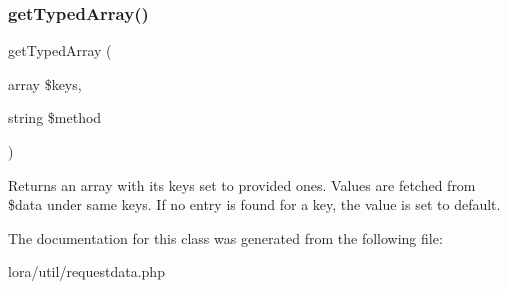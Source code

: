 \subsubsection{\texorpdfstring{get\+Typed\+Array()}{getTypedArray()}}
{\footnotesize\ttfamily get\+Typed\+Array (\begin{DoxyParamCaption}\item[{array}]{\$keys,  }\item[{string}]{\$method }\end{DoxyParamCaption})\hspace{0.3cm}{\ttfamily [private]}}

Returns an array with its keys set to provided ones. Values are fetched from \$data under same keys. If no entry is found for a key, the value is set to default. 


The documentation for this class was generated from the following file\+:\begin{DoxyCompactItemize}
\item 
lora/util/requestdata.\+php\end{DoxyCompactItemize}
